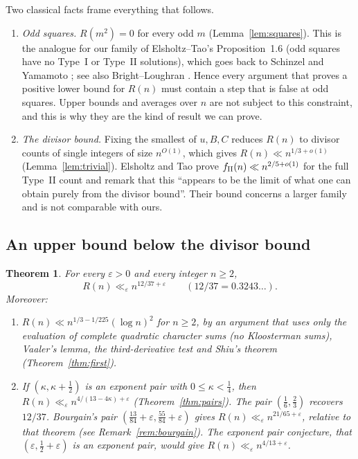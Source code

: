 \documentclass[11pt,reqno]{amsart}
\newtheorem{introthm}{Theorem}
\theoremstyle{definition}
\newcommand{\eps}{\varepsilon}
\begin{document}
Two classical facts frame everything that follows.
\begin{enumerate}
\item \emph{Odd squares.}  $R(m^2)=0$ for every odd $m$
(Lemma~\ref{lem:squares}).  This is the analogue for our family of
Elsholtz--Tao's Proposition~1.6 (odd squares have no Type~I or Type~II
solutions), which goes back to Schinzel and Yamamoto \cite{Yamamoto};
see also Bright--Loughran \cite[Cor.~1.4]{BL}.  Hence
every argument that proves a positive lower bound for $R(n)$ must
contain a step that is false at odd squares.  Upper bounds and averages
over $n$ are not subject to this constraint, and this is why they are
the kind of result we can prove.
\item \emph{The divisor bound.}  Fixing the smallest of $u,B,C$
reduces $R(n)$ to divisor counts of single integers of size
$n^{O(1)}$, which gives $R(n)\ll n^{1/3+o(1)}$
(Lemma~\ref{lem:trivial}).  Elsholtz and Tao prove
$f_{\rm II}(n)\ll n^{2/5+o(1)}$ for the full Type~II count
\cite[Prop.~1.7]{ET} and remark that this ``appears to be the limit of
what one can obtain purely from the divisor bound''.  Their bound
concerns a larger family and is not comparable with ours.
\end{enumerate}

\subsection{An upper bound below the divisor bound}
\begin{introthm}\label{thm:A}
For every $\eps>0$ and every integer $n\ge2$,
\[
 R(n)\ll_\eps n^{12/37+\eps}\qquad(12/37=0.3243\ldots).
\]
Moreover:
\begin{enumerate}
\item[(a)] $R(n)\ll n^{1/3-1/225}(\log n)^2$ for $n\ge 2$, by an argument
that uses only the evaluation of complete quadratic character sums (no
Kloosterman sums), Vaaler's lemma, the third-derivative test and Shiu's
theorem (Theorem~\ref{thm:first}).
\item[(b)] If $(\kappa,\kappa+\frac12)$ is an exponent pair with
$0\le\kappa<\frac14$, then $R(n)\ll_\eps n^{4/(13-4\kappa)+\eps}$
(Theorem~\ref{thm:pairs}).  The pair $(\frac16,\frac23)$ recovers
$12/37$.  Bourgain's pair $(\frac{13}{84}+\eps,\frac{55}{84}+\eps)$
\cite[Thm.~6]{Bourgain} gives $R(n)\ll_\eps n^{21/65+\eps}$, relative to
that theorem (see Remark~\ref{rem:bourgain}).  The exponent pair
conjecture, that $(\eps,\frac12+\eps)$ is an exponent pair, would give
$R(n)\ll_\eps n^{4/13+\eps}$.
\end{enumerate}
\end{introthm}
\end{document}
